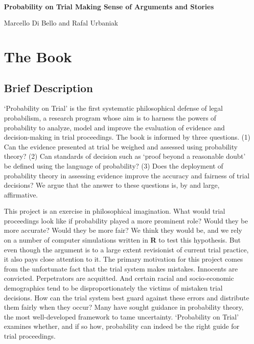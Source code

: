 \documentclass[
  10pt,
  dvipsnames,enabledeprecatedfontcommands]{scrartcl}
\author{}
\date{\vspace{-2.5em}}
\begin{document}
\begin{center}

$\, $

\vspace{-10mm}

\textbf{\huge  Probability on Trial \linebreak \normalsize  Making Sense of Arguments and Stories}
\vspace{1mm}

Marcello Di Bello and Rafal Urbaniak
\end{center}

\vspace{-6mm}

\hypertarget{the-book}{%
\section{The Book}\label{the-book}}

\vspace{-2mm}

\hypertarget{brief-description}{%
\subsection{Brief Description}\label{brief-description}}

\normalsize

`Probability on Trial' is the first systematic philosophical defense of
legal probabilism, a research program whose aim is to harness the powers
of probability to analyze, model and improve the evaluation of evidence
and decision-making in trial proceedings. The book is informed by three
questions. (1) Can the evidence presented at trial be weighed and
assessed using probability theory? (2) Can standards of decision such as
`proof beyond a reasonable doubt' be defined using the language of
probability? (3) Does the deployment of probability theory in assessing
evidence improve the accuracy and fairness of trial decisions? We argue
that the answer to these questions is, by and large, affirmative.

This project is an exercise in philosophical imagination. What would
trial proceedings look like if probability played a more prominent role?
Would they be more accurate? Would they be more fair? We think they
would be, and we rely on a number of computer simulations written in
\textbf{\textsf{R}} to test this hypothesis. But even though the
argument is to a large extent revisionist of current trial practice, it
also pays close attention to it. The primary motivation for this project
comes from the unfortunate fact that the trial system makes mistakes.
Innocents are convicted. Perpetrators are acquitted. And certain racial
and socio-economic demographics tend to be disproportionately the
victims of mistaken trial decisions. How can the trial system best guard
against these errors and distribute them fairly when they occur? Many
have sought guidance in probability theory, the most well-developed
framework to tame uncertainty. `Probability on Trial' examines whether,
and if so how, probability can indeed be the right guide for trial
proceedings.
\end{document}
